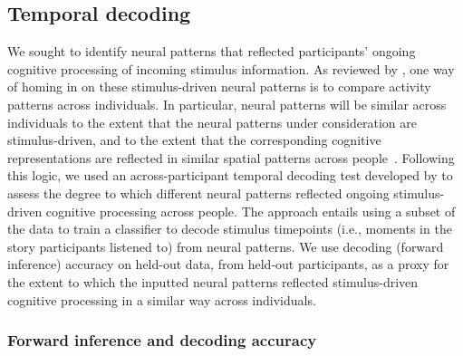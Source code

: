 \documentclass[english, 11pt]{article}
\begin{document}
\subsection*{Temporal decoding}

We sought to identify neural patterns that reflected participants' ongoing
cognitive processing of incoming stimulus information. As reviewed by
\cite{SimoEtal16}, one way of homing in on these stimulus-driven neural
patterns is to compare activity patterns across individuals. In particular,
neural patterns will be similar across individuals to the extent that the
neural patterns under consideration are stimulus-driven, and to the extent that
the corresponding cognitive representations are reflected in similar spatial
patterns across people~\citep{SimoChan20}. Following this logic, we used an
across-participant temporal decoding test developed by \cite{MannEtal18} to
assess the degree to which different neural patterns reflected ongoing
stimulus-driven cognitive processing across people. The approach entails using
a subset of the data to train a classifier to decode stimulus timepoints (i.e.,
moments in the story participants listened to) from neural patterns. We use
decoding (forward inference) accuracy on held-out data, from held-out
participants, as a proxy for the extent to which the inputted neural patterns
reflected stimulus-driven cognitive processing in a similar way across
individuals.

\subsubsection*{Forward inference and decoding accuracy}
\end{document}
